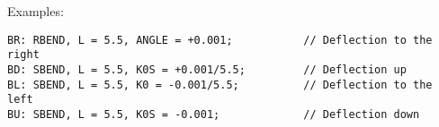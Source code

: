 Examples: 
\begin{verbatim}
BR: RBEND, L = 5.5, ANGLE = +0.001;           // Deflection to the right
BD: SBEND, L = 5.5, K0S = +0.001/5.5;         // Deflection up
BL: SBEND, L = 5.5, K0 = -0.001/5.5;          // Deflection to the left
BU: SBEND, L = 5.5, K0S = -0.001;             // Deflection down
\end{verbatim}

